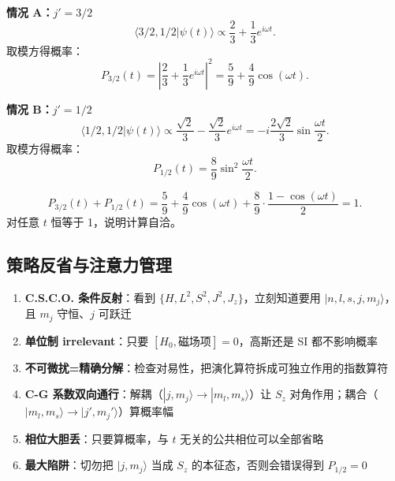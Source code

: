 \textbf{情况 A：$j'=3/2$}
\[
\langle 3/2,1/2 | \psi(t) \rangle \propto \frac{2}{3} + \frac{1}{3}e^{i\omega t}.
\]
取模方得概率：
\[
P_{3/2}(t) = \left| \frac{2}{3} + \frac{1}{3}e^{i\omega t} \right|^2 = \frac{5}{9} + \frac{4}{9}\cos(\omega t).
\]

\textbf{情况 B：$j'=1/2$}
\[
\langle 1/2,1/2 | \psi(t) \rangle \propto \frac{\sqrt{2}}{3} - \frac{\sqrt{2}}{3}e^{i\omega t} = -i\frac{2\sqrt{2}}{3}\sin\frac{\omega t}{2}.
\]
取模方得概率：
\[
P_{1/2}(t) = \frac{8}{9}\sin^2\frac{\omega t}{2}.
\]

\begin{tipbox}[守恒校验]
\[
P_{3/2}(t) + P_{1/2}(t) = \frac{5}{9}+\frac{4}{9}\cos(\omega t) + \frac{8}{9}\cdot\frac{1-\cos(\omega t)}{2} = 1.
\]
对任意 $t$ 恒等于 1，说明计算自洽。
\end{tipbox}

\subsection{策略反省与注意力管理}

\begin{enumerate}[nosep]
    \item \textbf{C.S.C.O. 条件反射}：看到 $\{H, L^2, S^2, J^2, J_z\}$，立刻知道要用 $|n,l,s,j,m_j\rangle$，且 $m_j$ 守恒、$j$ 可跃迁
    \item \textbf{单位制 irrelevant}：只要 $[H_0, \text{磁场项}]=0$，高斯还是 SI 都不影响概率
    \item \textbf{不可微扰=精确分解}：检查对易性，把演化算符拆成可独立作用的指数算符
    \item \textbf{C-G 系数双向通行}：解耦（$|j,m_j\rangle \to |m_l,m_s\rangle$）让 $S_z$ 对角作用；耦合（$|m_l,m_s\rangle \to |j',m_j'\rangle$）算概率幅
    \item \textbf{相位大胆丢}：只要算概率，与 $t$ 无关的公共相位可以全部省略
    \item \textbf{最大陷阱}：切勿把 $|j,m_j\rangle$ 当成 $S_z$ 的本征态，否则会错误得到 $P_{1/2}=0$
\end{enumerate}

\newpage

\newpage

\newpage

\newpage

\newpage

\newpage

\newpage

\newpage

\newpage

\newpage

\newpage

\newpage

\newpage

\newpage

\newpage

\newpage

\newpage

\newpage

\newpage

\newpage

\newpage
